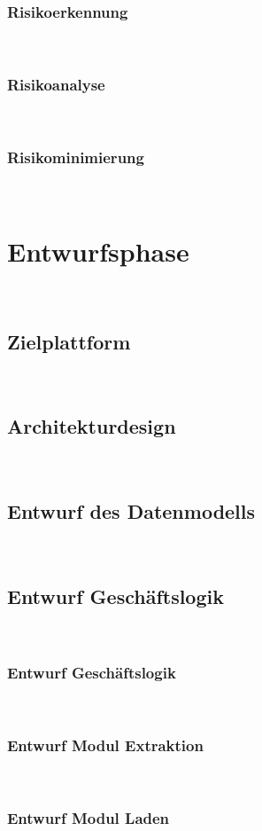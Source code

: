 \documentclass[11pt,toc=sectionentrywithoutdots, headheight=44pt, headings=optiontoheadandtoc, hyperfootnotes=false]{scrartcl}
\begin{document}
\subsubsection{Risikoerkennung}
\blindtext\

\subsubsection{Risikoanalyse}
\blindtext\

\subsubsection{Risikominimierung}
\blindtext\

\section{Entwurfsphase}
\blindtext\

\subsection{Zielplattform}
\blindtext\

\subsection{Architekturdesign}
\blindtext\

\subsection{Entwurf des Datenmodells}
\blindtext\

\subsection{Entwurf Geschäftslogik}
\blindtext\

\subsubsection{Entwurf Geschäftslogik}
\blindtext\

\subsubsection{Entwurf Modul Extraktion}
\blindtext\

\subsubsection{Entwurf Modul Laden}
\blindtext\
\end{document}

